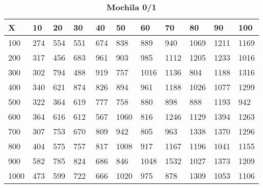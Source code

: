 \documentclass[10pt,letterpaper]{article}
\begin{document}
\newpage 
{}
\begin{center}
\begin{table}\renewcommand{\arraystretch}{2.5}
\caption{\large \textbf{Mochila 0/1}}
\centering
\begin{tabular} { |m{0.5cm}|m{1.3cm}|m{1.3cm}|m{1.3cm}|m{1.3cm}|m{1.3cm}|m{1.3cm}|m{1.3cm}|m{1.3cm}|m{1.3cm}|m{1.3cm}|} 
\hline
\rowcolor{Gray}
\centering \textbf{X} & \centering \textbf{10} & \centering \textbf{20} & \centering \textbf{30}\ & \centering \textbf{40} & \centering \textbf{50} & \centering \textbf{60}\ & \centering \textbf{70} & \centering \textbf{80} & \centering \textbf{90}\ & \textbf{100} \\\hline
\cellcolor{Gray}100 & \Large 274 & \Large 554 & \Large 551 & \Large 674 & \Large 838 & \Large 889 & \Large 940 & \Large 1069 & \Large 1211 & \Large 1169 \\
\hline
\cellcolor{Gray}200 & \Large 317 & \Large 456 & \Large 683 & \Large 961 & \Large 903 & \Large 985 & \Large 1112 & \Large 1205 & \Large 1233 & \Large 1016 \\
\hline
\cellcolor{Gray}300 & \Large 302 & \Large 794 & \Large 488 & \Large 919 & \Large 757 & \Large 1016 & \Large 1136 & \Large 804 & \Large 1188 & \Large 1316 \\
\hline
\cellcolor{Gray}400 & \Large 340 & \Large 621 & \Large 874 & \Large 826 & \Large 894 & \Large 961 & \Large 1188 & \Large 1026 & \Large 1077 & \Large 1299 \\
\hline
\cellcolor{Gray}500 & \Large 322 & \Large 364 & \Large 619 & \Large 777 & \Large 758 & \Large 880 & \Large 898 & \Large 888 & \Large 1193 & \Large 942 \\
\hline
\cellcolor{Gray}600 & \Large 364 & \Large 616 & \Large 612 & \Large 567 & \Large 1060 & \Large 816 & \Large 1246 & \Large 1129 & \Large 1394 & \Large 1263 \\
\hline
\cellcolor{Gray}700 & \Large 307 & \Large 753 & \Large 670 & \Large 809 & \Large 942 & \Large 805 & \Large 963 & \Large 1338 & \Large 1370 & \Large 1296 \\
\hline
\cellcolor{Gray}800 & \Large 404 & \Large 575 & \Large 757 & \Large 817 & \Large 1008 & \Large 917 & \Large 1167 & \Large 1196 & \Large 1041 & \Large 1155 \\
\hline
\cellcolor{Gray}900 & \Large 582 & \Large 785 & \Large 824 & \Large 686 & \Large 846 & \Large 1048 & \Large 1532 & \Large 1027 & \Large 1373 & \Large 1209 \\
\hline
\cellcolor{Gray}1000 & \Large 473 & \Large 599 & \Large 722 & \Large 666 & \Large 1020 & \Large 975 & \Large 878 & \Large 1309 & \Large 1053 & \Large 1106 \\
\hline
\end{tabular} \\
\end{table}
\end{center}
\end{document}
